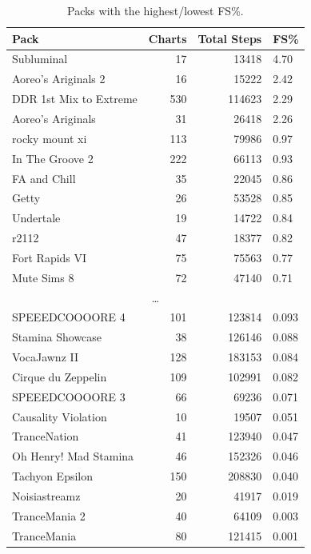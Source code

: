 \documentclass[10pt]{sigplanconf}
\begin{document}
\begin{table}[p]
	\begin{center}
		\small
	\begin{tabular}{l|r|r|l}
		\bf Pack & \bf Charts & \bf Total Steps & \bf FS\% \\
		\hline
		Subluminal               &   17 &  13418 & 4.70 \\
		Aoreo's Ariginals 2      &   16 &  15222 & 2.42 \\
		DDR 1st Mix to Extreme   &  530 & 114623 & 2.29 \\
		Aoreo's Ariginals        &   31 &  26418 & 2.26 \\
		rocky mount xi           &  113 &  79986 & 0.97 \\
		In The Groove 2          &  222 &  66113 & 0.93 \\
		FA and Chill             &   35 &  22045 & 0.86 \\
		Getty                    &   26 &  53528 & 0.85 \\
		Undertale                &   19 &  14722 & 0.84 \\
		r2112                    &   47 &  18377 & 0.82 \\
		Fort Rapids VI           &   75 &  75563 & 0.77 \\
		Mute Sims 8              &   72 &  47140 & 0.71 \\
		\multicolumn{4}{c}{\normalsize\dots} \\
		SPEEEDCOOOORE 4          &  101 & 123814 & 0.093 \\
		Stamina Showcase         &   38 & 126146 & 0.088 \\
		VocaJawnz II             &  128 & 183153 & 0.084 \\
		Cirque du Zeppelin       &  109 & 102991 & 0.082 \\
		SPEEEDCOOOORE 3          &   66 &  69236 & 0.071 \\
		Causality Violation      &   10 &  19507 & 0.051 \\
		TranceNation             &   41 & 123940 & 0.047 \\
		Oh Henry! Mad Stamina    &   46 & 152326 & 0.046 \\
		Tachyon Epsilon          &  150 & 208830 & 0.040 \\
		Noisiastreamz            &   20 &  41917 & 0.019 \\
		TranceMania 2            &   40 &  64109 & 0.003 \\
		TranceMania              &   80 & 121415 & 0.001 \\
	\end{tabular}
	\end{center}
	\caption{Packs with the highest/lowest FS\%.}
	\label{tab:pack-fs}
\end{table}
\end{document}
